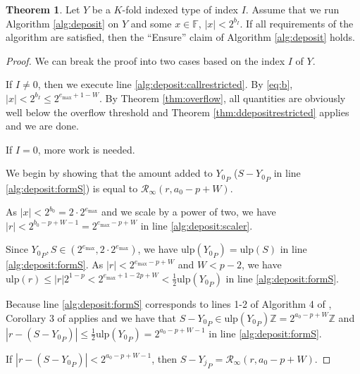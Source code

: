 \documentclass[12pt]{article}
\providecommand{\F}{\ensuremath{\mathbb{F}}}
\providecommand{\Z}{\ensuremath{\mathbb{Z}}}
\providecommand{\max}{\ensuremath{\text{max}}}
\providecommand{\ulp}{\ensuremath{\text{ulp}}}
\providecommand{\roundtonearestinfty}{\ensuremath{\mathcal{R}_\text{$\infty$}}}
\theoremstyle{definition}
\newtheorem{thm}{Theorem}[section]
\numberwithin{equation}{section}
\numberwithin{figure}{section}
\begin{document}
      \begin{samepage}
      \begin{thm}
        Let $Y$ be a $K$-fold indexed type of index $I$. Assume that we run Algorithm \ref{alg:deposit} on $Y$ and some $x \in \F$, $|x| < 2^{b_I}$. If all requirements of the algorithm are satisfied, then the ``Ensure'' claim of Algorithm \ref{alg:deposit} holds.
        \label{thm:ddeposit}
      \end{thm}
    \end{samepage}

      \begin{proof}
        We can break the proof into two cases based on the index $I$ of $Y$.

        If $I \neq 0$, then we execute line \ref{alg:deposit:callrestricted}. By  \eqref{eq:b}, $|x| < 2^{b_I} \leq 2^{e_{\max} + 1 - W}$. By Theorem \ref{thm:overflow}, all quantities are obviously well below the overflow threshold and Theorem \ref{thm:ddepositrestricted} applies and we are done.

        If $I = 0$, more work is needed.

        We begin by showing that the amount added to ${Y_0}_P$ ($S - {Y_0}_P$ in line \ref{alg:deposit:formS}) is equal to $\roundtonearestinfty(r, a_0 - p + W)$.

        As $|x| < 2^{b_0} = 2 \cdot 2^{e_{\max}}$ and we scale by a power of two, we have $|r| < 2^{b_0 - p + W - 1} = 2^{e_{\max} - p + W}$ in line \ref{alg:deposit:scaler}.

        Since ${Y_0}_P, S \in (2^{e_{\max}}, 2 \cdot 2^{e_{\max}})$, we have $\ulp({Y_0}_P) = \ulp(S)$ in line \ref{alg:deposit:formS}. As $|r| < 2^{e_{\max} - p + W}$ and $W < p - 2$, we have $\ulp(r) \leq |r| 2^{1 - p} < 2^{e_{\max} + 1 - 2p + W} < \frac{1}{2}\ulp({Y_0}_P)$ in line \ref{alg:deposit:formS}.

        Because line \ref{alg:deposit:formS} corresponds to lines 1-2 of Algorithm 4 of \cite{repsum}, Corollary 3 of \cite{repsum} applies and we have that $S - {Y_0}_P \in \ulp({Y_0}_P)\Z = 2^{a_0 - p + W}\Z$ and $|r - (S - {Y_0}_P)| \leq \frac{1}{2}  \ulp({Y_0}_P) = 2^{a_0 - p + W - 1}$ in line \ref{alg:deposit:formS}.

        If $|r - (S - {Y_0}_P)| < 2^{a_{0} - p + W - 1}$, then $S - {Y_j}_P = \roundtonearestinfty(r, a_{0} - p + W)$.


\end{proof}
\end{document}
